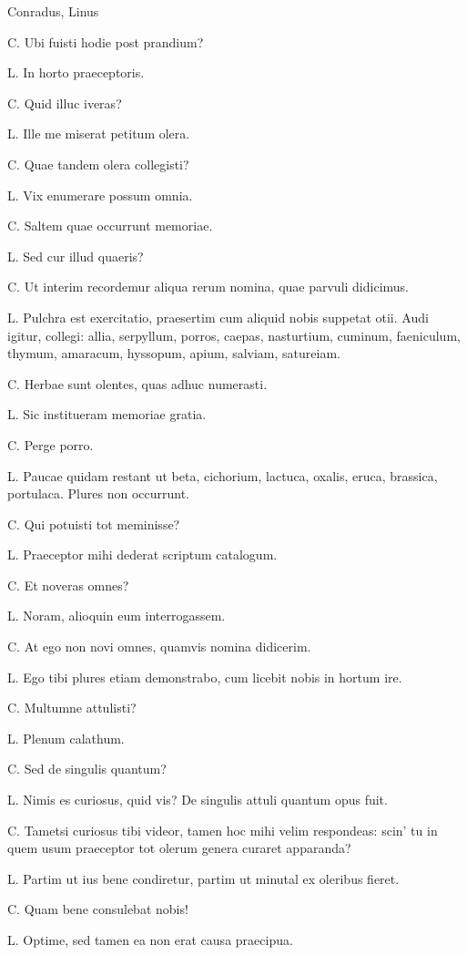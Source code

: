 \documentclass{article}
\begin{document}
Conradus, Linus

C. Ubi fuisti hodie post prandium?

L. In horto praeceptoris.

C. Quid illuc iveras?

L. Ille me miserat petitum olera.

C. Quae tandem olera collegisti?

L. Vix enumerare possum omnia.

C. Saltem quae occurrunt memoriae.

L. Sed cur illud quaeris?

C. Ut interim recordemur aliqua rerum nomina, quae parvuli didicimus.

L. Pulchra est exercitatio, praesertim cum aliquid nobis suppetat otii. Audi igitur, collegi: allia, serpyllum, porros, caepas, nasturtium, cuminum, faeniculum, thymum, amaracum, hyssopum, apium, salviam, satureiam.

C. Herbae sunt olentes, quas adhuc numerasti.

L. Sic institueram memoriae gratia.

C. Perge porro.

L. Paucae quidam restant ut beta, cichorium, lactuca, oxalis, eruca, brassica, portulaca. Plures non occurrunt.

C. Qui potuisti tot meminisse?

L. Praeceptor mihi dederat scriptum catalogum.

C. Et noveras omnes?

L. Noram, alioquin eum interrogassem.

C. At ego non novi omnes, quamvis nomina didicerim.

L. Ego tibi plures etiam demonstrabo, cum licebit nobis in hortum ire.

C. Multumne attulisti?

L. Plenum calathum.

C. Sed de singulis quantum?

L. Nimis es curiosus, quid vis? De singulis attuli quantum opus fuit.

C. Tametsi curiosus tibi videor, tamen hoc mihi velim respondeas: scin' tu in quem usum praeceptor tot olerum genera curaret apparanda?

L. Partim ut ius bene condiretur, partim ut minutal ex oleribus fieret.

C. Quam bene consulebat nobis!

L. Optime, sed tamen ea non erat causa praecipua.
\end{document}
